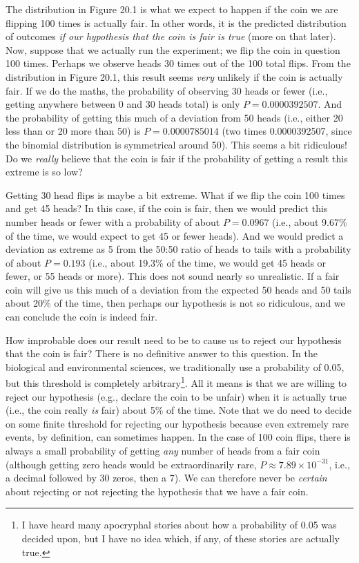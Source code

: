 \documentclass[
]{scrbook}
\begin{document}
The distribution in Figure 20.1 is what we expect to happen if the coin we are flipping 100 times is actually fair.
In other words, it is the predicted distribution of outcomes \emph{if our hypothesis that the coin is fair is true} (more on that later).
Now, suppose that we actually run the experiment; we flip the coin in question 100 times.
Perhaps we observe heads 30 times out of the 100 total flips.
From the distribution in Figure 20.1, this result seems \emph{very} unlikely if the coin is actually fair.
If we do the maths, the probability of observing 30 heads or fewer (i.e., getting anywhere between 0 and 30 heads total) is only \(P = 0.0000392507\).
And the probability of getting this much of a deviation from 50 heads (i.e., either 20 less than or 20 more than 50) is \(P = 0.0000785014\) (two times 0.0000392507, since the binomial distribution is symmetrical around 50).
This seems a bit ridiculous!
Do we \emph{really} believe that the coin is fair if the probability of getting a result this extreme is so low?

Getting 30 head flips is maybe a bit extreme.
What if we flip the coin 100 times and get 45 heads?
In this case, if the coin is fair, then we would predict this number heads or fewer with a probability of about \(P = 0.0967\) (i.e., about 9.67\% of the time, we would expect to get 45 or fewer heads).
And we would predict a deviation as extreme as 5 from the 50:50 ratio of heads to tails with a probability of about \(P = 0.193\) (i.e., about 19.3\% of the time, we would get 45 heads or fewer, or 55 heads or more).
This does not sound nearly so unrealistic.
If a fair coin will give us this much of a deviation from the expected 50 heads and 50 tails about 20\% of the time, then perhaps our hypothesis is not so ridiculous, and we can conclude the coin is indeed fair.

How improbable does our result need to be to cause us to reject our hypothesis that the coin is fair?
There is no definitive answer to this question.
In the biological and environmental sciences, we traditionally use a probability of 0.05, but this threshold is completely arbitrary\footnote{I have heard many apocryphal stories about how a probability of 0.05 was decided upon, but I have no idea which, if any, of these stories are actually true.}.
All it means is that we are willing to reject our hypothesis (e.g., declare the coin to be unfair) when it is actually true (i.e., the coin really \emph{is} fair) about 5\% of the time.
Note that we do need to decide on some finite threshold for rejecting our hypothesis because even extremely rare events, by definition, can sometimes happen.
In the case of 100 coin flips, there is always a small probability of getting \emph{any} number of heads from a fair coin (although getting zero heads would be extraordinarily rare, \(P \approx 7.89 \times 10^{-31}\), i.e., a decimal followed by 30 zeros, then a 7).
We can therefore never be \emph{certain} about rejecting or not rejecting the hypothesis that we have a fair coin.
\end{document}
